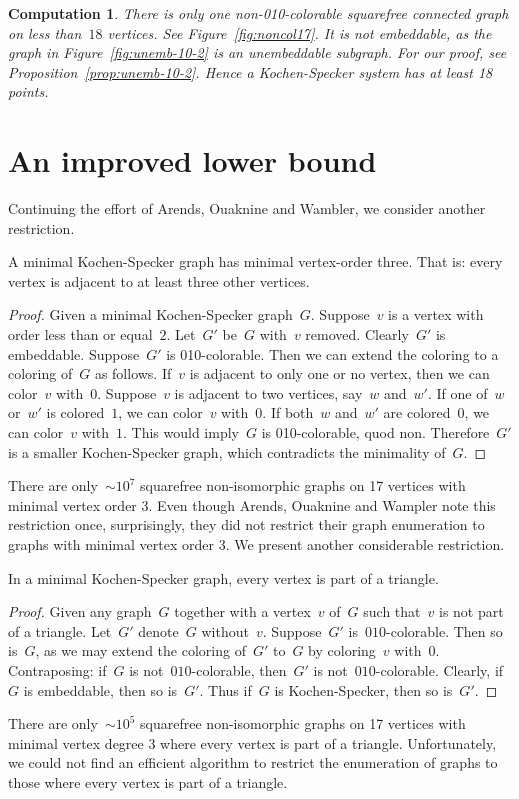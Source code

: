 \documentclass{report}
\newtheorem{comp}{Computation}[section]
\begin{document}
\begin{comp}
There is only one non-010-colorable squarefree connected graph
on less than~$18$ vertices.  See Figure~\ref{fig:noncol17}.
It is not embeddable, as the graph in Figure~\ref{fig:unemb-10-2}
is an unembeddable subgraph.  For our proof,
see Proposition~\ref{prop:unemb-10-2}.
Hence a Kochen-Specker
system has at least 18 points.
\end{comp}

\section{An improved lower bound}
\label{sec:ilb}
Continuing the effort of Arends, Ouaknine and Wambler,
we consider another restriction.
\begin{proposition}
    A minimal Kochen-Specker graph has minimal vertex-order three.
    That is: every vertex is adjacent to at least three other vertices.
\end{proposition}
\begin{proof}
    Given a minimal Kochen-Specker graph~$G$.
    Suppose~$v$ is a vertex with order less than or equal~$2$.
    Let~$G'$ be~$G$ with~$v$ removed.
    Clearly~$G'$ is embeddable.
    Suppose~$G'$ is 010-colorable.
    Then we can extend the coloring to a coloring of~$G$ as follows.
    If~$v$ is adjacent to only one or no vertex,
    then we can color~$v$ with~$0$.
    Suppose~$v$ is adjacent to two vertices, say~$w$ and~$w'$.
    If one of~$w$ or~$w'$ is colored~$1$, we can color~$v$ with~$0$.
    If both~$w$ and~$w'$ are colored~$0$, we can color~$v$ with~$1$.
    This would imply~$G$ is 010-colorable, quod non.
    Therefore~$G'$ is a smaller
    Kochen-Specker graph, which contradicts the minimality of~$G$.
\end{proof}
There are only~${\sim}10^7$
squarefree non-isomorphic graphs on 17 vertices with minimal vertex order 3.
Even though Arends, Ouaknine and Wampler
note this restriction once,
surprisingly, they did not restrict their graph enumeration
to graphs with minimal vertex order 3.
We present another considerable restriction.

\begin{proposition}\label{prop:ks-enoughtriangles}
    In a minimal Kochen-Specker graph,
        every vertex is part of a triangle.
\end{proposition}
\begin{proof}
    Given any graph~$G$ together with a vertex~$v$ of~$G$
        such that~$v$ is not part of a triangle.
    Let~$G'$ denote~$G$ without~$v$.
    Suppose~$G'$ is~$010$-colorable.
    Then so is~$G$, as we may extend the coloring of~$G'$
        to~$G$ by coloring~$v$ with~$0$.
    Contraposing: if~$G$ is not~$010$-colorable,
        then~$G'$ is not~$010$-colorable.
    Clearly, if~$G$ is embeddable, then so is~$G'$.
    Thus if~$G$ is Kochen-Specker, then so is~$G'$.
\end{proof}
There are only~${\sim}10^5$ squarefree non-isomorphic 
graphs on 17 vertices with minimal vertex degree 3
where every vertex is part of a triangle.
Unfortunately,
we could not find an efficient algorithm
to restrict the enumeration of graphs
to those where every vertex is part of a triangle.
\end{document}
